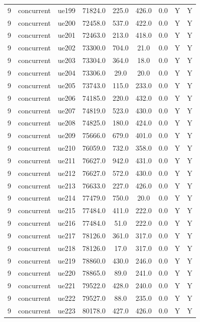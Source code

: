 \begin{table}[ht]
\begin{tabular}{|c|c|c|c|c|c|c|c|c|}
9 & concurrent & ue199 & 71824.0 & 225.0 & 426.0 & 0.0 & Y & Y \\
9 & concurrent & ue200 & 72458.0 & 537.0 & 422.0 & 0.0 & Y & Y \\
9 & concurrent & ue201 & 72463.0 & 213.0 & 418.0 & 0.0 & Y & Y \\
9 & concurrent & ue202 & 73300.0 & 704.0 & 21.0 & 0.0 & Y & Y \\
9 & concurrent & ue203 & 73304.0 & 364.0 & 18.0 & 0.0 & Y & Y \\
9 & concurrent & ue204 & 73306.0 & 29.0 & 20.0 & 0.0 & Y & Y \\
9 & concurrent & ue205 & 73743.0 & 115.0 & 233.0 & 0.0 & Y & Y \\
9 & concurrent & ue206 & 74185.0 & 220.0 & 432.0 & 0.0 & Y & Y \\
9 & concurrent & ue207 & 74819.0 & 523.0 & 430.0 & 0.0 & Y & Y \\
9 & concurrent & ue208 & 74825.0 & 180.0 & 424.0 & 0.0 & Y & Y \\
9 & concurrent & ue209 & 75666.0 & 679.0 & 401.0 & 0.0 & Y & Y \\
9 & concurrent & ue210 & 76059.0 & 732.0 & 358.0 & 0.0 & Y & Y \\
9 & concurrent & ue211 & 76627.0 & 942.0 & 431.0 & 0.0 & Y & Y \\
9 & concurrent & ue212 & 76627.0 & 572.0 & 430.0 & 0.0 & Y & Y \\
9 & concurrent & ue213 & 76633.0 & 227.0 & 426.0 & 0.0 & Y & Y \\
9 & concurrent & ue214 & 77479.0 & 750.0 & 20.0 & 0.0 & Y & Y \\
9 & concurrent & ue215 & 77484.0 & 411.0 & 222.0 & 0.0 & Y & Y \\
9 & concurrent & ue216 & 77484.0 & 51.0 & 222.0 & 0.0 & Y & Y \\
9 & concurrent & ue217 & 78126.0 & 361.0 & 317.0 & 0.0 & Y & Y \\
9 & concurrent & ue218 & 78126.0 & 17.0 & 317.0 & 0.0 & Y & Y \\
9 & concurrent & ue219 & 78860.0 & 430.0 & 246.0 & 0.0 & Y & Y \\
9 & concurrent & ue220 & 78865.0 & 89.0 & 241.0 & 0.0 & Y & Y \\
9 & concurrent & ue221 & 79522.0 & 428.0 & 240.0 & 0.0 & Y & Y \\
9 & concurrent & ue222 & 79527.0 & 88.0 & 235.0 & 0.0 & Y & Y \\
9 & concurrent & ue223 & 80178.0 & 427.0 & 426.0 & 0.0 & Y & Y \\

\end{tabular}
\end{table}
